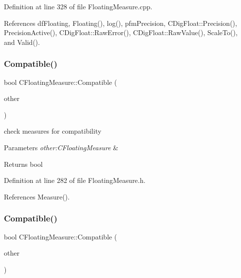 Definition at line 328 of file Floating\+Measure.\+cpp.



References df\+Floating, Floating(), log(), pfm\+Precision, C\+Dig\+Float\+::\+Precision(), Precision\+Active(), C\+Dig\+Float\+::\+Raw\+Error(), C\+Dig\+Float\+::\+Raw\+Value(), Scale\+To(), and Valid().

\mbox{\label{classCFloatingMeasure_ae69672971857cf047c5bc7ab4b631b6c}} 
\subsubsection{\texorpdfstring{Compatible()}{Compatible()}\hspace{0.1cm}{\footnotesize\ttfamily [1/2]}}
{\footnotesize\ttfamily bool C\+Floating\+Measure\+::\+Compatible (\begin{DoxyParamCaption}\item[{const \hyperlink{classCFloatingMeasure}{C\+Floating\+Measure} \&}]{other }\end{DoxyParamCaption})\hspace{0.3cm}{\ttfamily [inline]}}



check measures for compatibility 


\begin{DoxyParams}{Parameters}
{\em other\+:\+C\+Floating\+Measure} & \\
\hline
\end{DoxyParams}
\begin{DoxyReturn}{Returns}
bool 
\end{DoxyReturn}


Definition at line 282 of file Floating\+Measure.\+h.



References Measure().

\mbox{\label{classCFloatingMeasure_a5cf69c287abe4e2f65242e97093f7595}} 
\subsubsection{\texorpdfstring{Compatible()}{Compatible()}\hspace{0.1cm}{\footnotesize\ttfamily [2/2]}}
{\footnotesize\ttfamily bool C\+Floating\+Measure\+::\+Compatible (\begin{DoxyParamCaption}\item[{const \hyperlink{classCComplexMeasure}{C\+Complex\+Measure} \&}]{other }\end{DoxyParamCaption})\hspace{0.3cm}{\ttfamily [inline]}}



